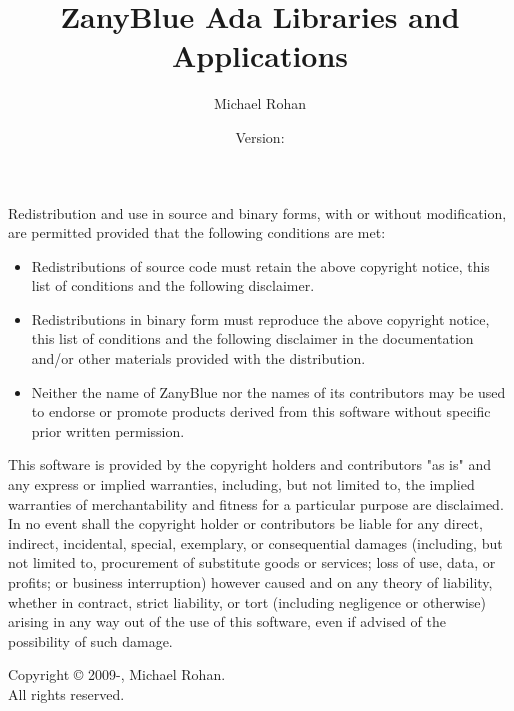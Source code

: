 \documentclass[11pt,titlepage]{report}
\title{ZanyBlue Ada Libraries and Applications}
\date{Version: \Version}
\author{Michael Rohan}
\begin{document}
\maketitle
\clearpage
\begin{titlepage}
Redistribution and use in source and binary forms, with or without
modification, are permitted provided that the following conditions
are met:
\begin{itemize}
\item Redistributions of source code must retain the above copyright
      notice, this list of conditions and the following disclaimer.

\item Redistributions in binary form must reproduce the above copyright
      notice, this list of conditions and the following disclaimer in the
      documentation and/or other materials provided with the distribution.

\item Neither the name of ZanyBlue nor the names of its contributors may
      be used to endorse or promote products derived from this software
      without specific prior written permission.
\end{itemize}

\begin{em}
This software is provided by the copyright holders and contributors
"as is" and any express or implied warranties, including, but not
limited to, the implied warranties of merchantability and fitness for
a particular purpose are disclaimed. In no event shall the copyright
holder or contributors be liable for any direct, indirect, incidental,
special, exemplary, or consequential damages (including, but not limited
to, procurement of substitute goods or services; loss of use, data, or
profits; or business interruption) however caused and on any theory of
liability, whether in contract, strict liability, or tort (including
negligence or otherwise) arising in any way out of the use of this
software, even if advised of the possibility of such damage.
\end{em}
\vfill
\noindent Copyright \copyright{} 2009-\CopyrightYear, Michael Rohan.\\
\noindent All rights reserved.
\end{titlepage}

\tableofcontents
\clearpage
{}




%




\end{document}
